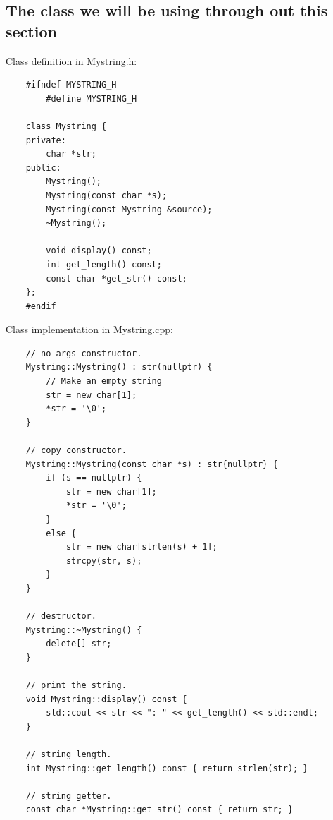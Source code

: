 \subsection{The class we will be using through out this section}
Class definition in Mystring.h:
\begin{verbatim}
    #ifndef MYSTRING_H
        #define MYSTRING_H

    class Mystring {
    private:
        char *str;
    public:
        Mystring();
        Mystring(const char *s);
        Mystring(const Mystring &source);
        ~Mystring();

        void display() const;
        int get_length() const;
        const char *get_str() const;
    };
    #endif
\end{verbatim}
Class implementation in Mystring.cpp:
\begin{verbatim}
    // no args constructor.
    Mystring::Mystring() : str(nullptr) {
        // Make an empty string
        str = new char[1];
        *str = '\0';
    }

    // copy constructor.
    Mystring::Mystring(const char *s) : str{nullptr} {
        if (s == nullptr) {
            str = new char[1];
            *str = '\0';
        }
        else {
            str = new char[strlen(s) + 1];
            strcpy(str, s);
        }
    }

    // destructor.
    Mystring::~Mystring() {
        delete[] str;
    }

    // print the string.
    void Mystring::display() const {
        std::cout << str << ": " << get_length() << std::endl;
    }

    // string length.
    int Mystring::get_length() const { return strlen(str); }

    // string getter.
    const char *Mystring::get_str() const { return str; }
\end{verbatim}


